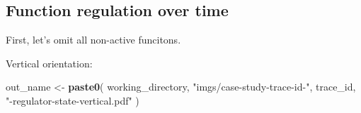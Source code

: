 \documentclass[]{book}
\newenvironment{Shaded}{\begin{snugshade}}{\end{snugshade}}
\newcommand{\KeywordTok}[1]{\textcolor[rgb]{0.13,0.29,0.53}{\textbf{#1}}}
\newcommand{\NormalTok}[1]{#1}
\newcommand{\StringTok}[1]{\textcolor[rgb]{0.31,0.60,0.02}{#1}}
\begin{document}
\hypertarget{function-regulation-over-time}{%
\subsection{Function regulation over time}\label{function-regulation-over-time}}

First, let's omit all non-active funcitons.

Vertical orientation:

\begin{Shaded}
\begin{Highlighting}[]
\NormalTok{out_name <-}\StringTok{ }\KeywordTok{paste0}\NormalTok{(}
\NormalTok{  working_directory,}
  \StringTok{"imgs/case-study-trace-id-"}\NormalTok{,}
\NormalTok{   trace_id,}
   \StringTok{"-regulator-state-vertical.pdf"}
\NormalTok{)}


\end{Highlighting}
\end{Shaded}
\end{document}
